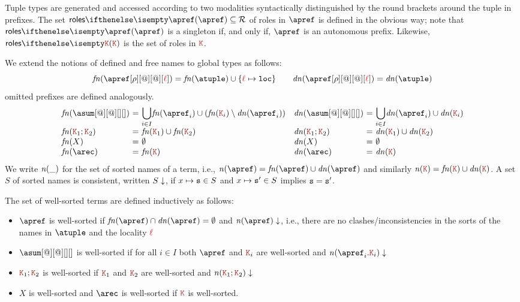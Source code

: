 Tuple types are generated and accessed according to two modalities
syntactically distinguished by the round brackets around the tuple
in prefixes.
%
The set $\roles \apref \subseteq \roleset$ of roles in $\apref$ is
defined in the obvious way; note that $\roles \apref$ is a singleton
if, and only if, $\apref$ is an autonomous prefix.
%
Likewise, $\roles \aK$ is the set of roles in
$\aK$.

We extend the notions of defined and free names to global types as
follows:
\[
 \fn{\apref[\arole][@][@][\alocvar]}
 = \fn \atuple \cup \{\alocvar \mapsto \asort[loc]\} 
\qquad
 \dn{\apref[\arole][@][@][\alocvar]} 
 = \dn \atuple 
\]
omitted prefixes are defined analogously.
\[
  \begin{array}{ll}
    \begin{array}{l@{\ =\ } ll}
      \fn{\asum[@][@][][]} & \displaystyle{\bigcup_{i\in I}} \fn{\apref_i} \cup (\fn{\aK_i}\setminus\dn{\apref_i})
      \\
      \fn{\aK_1; \aK_2} 
                &
                  \fn{\aK_1}\cup\fn{\aK_2}
      \\
      \fn X & \emptyset
      \\
      \fn \arec & \fn {\aK}
    \end{array}
    \begin{array}{l@{\ =\ } ll}
      \dn{\asum[@][@][][]} & \displaystyle{\bigcup_{i\in I}} \dn{\apref_i} \cup \dn{\aK_i}
      \\
      \dn{\aK_1; \aK_2} 
                           &
                             \dn{\aK_1}\cup\dn{\aK_2}
      \\
      \dn X & \emptyset
      \\
      \dn \arec & \dn {\aK}
    \end{array}
  \end{array}
\]
%
We write ${\it n}(\_)$ for the set of sorted names of a term, i.e.,
$\names \apref = \fn\apref \cup \dn\apref$ and similarly
$\names \aK = \fn\aK \cup \dn\aK$. A set $S$ of sorted names is
consistent, written $S\downarrow$, if $x\mapsto \mathtt{s} \in S$ and
$x\mapsto \mathtt{s}' \in S$ implies $\mathtt{s} = \mathtt{s}'$.
 
The set of well-sorted terms are defined inductively as follows:

\begin{itemize}
\item $\apref$ is well-sorted if $\fn\apref\cap\dn\apref = \emptyset$ and  
$\consistent{\names\apref}$, i.e., there are no clashes/inconsistencies in the sorts of 
the names in $\atuple$ and the locality ${\color{red}\ell}$
\item $\asum[@][@][][]$ is well-sorted if for all ${i\in I}$ both
  $\apref$ and ${\aK_i}$ are well-sorted and
  $\consistent{\names {\apref_i.\aK_i}}$
\item $\aK_1;\aK_2$ is well-sorted if $\aK_1$ and $\aK_2$ are
  well-sorted and $\consistent{\names{\aK_1;\aK_2}}$
\item $X$ is well-sorted and $\arec$ is well-sorted if $\aK$ is
  well-sorted.
\end{itemize}


